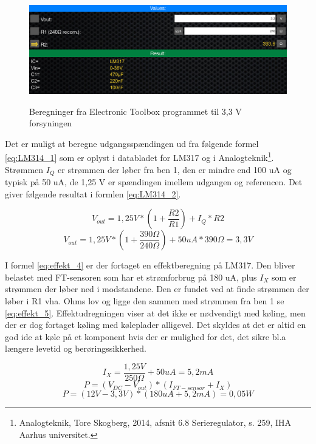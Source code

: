 \begin{figure}[H] \centering
{\includegraphics[width=\textwidth]{filer/design/Billeder/LM317_calc}}
\caption{Beregninger fra Electronic Toolbox programmet til 3,3 V forsyningen}
\label{lab:LM317_calc}
\raggedright
\end{figure}

Det er muligt at beregne udgangsspændingen ud fra følgende formel \ref{eq:LM314_1} som er oplyst i databladet for LM317 og i Analogteknik\footnote{Analogteknik, Tore Skogberg, 2014, afsnit 6.8 Serieregulator, s. 259, IHA Aarhus universitet.}. Strømmen $I_Q$ er strømmen der løber fra ben 1, den er mindre end 100 uA og typisk på 50 uA, de 1,25 V er spændingen imellem udgangen og referencen. Det giver følgende resultat i formlen \ref{eq:LM314_2}. 

\begin{equation} 
V_{out} = 1,25 V*(1+\frac{R2}{R1})+I_Q*R2
\label{eq:LM314_1}
\end{equation}
\begin{equation} 
V_{out} = 1,25 V*(1+\frac{390\Omega}{240\Omega})+50uA*390\Omega = 3,3 V
\label{eq:LM314_2}
\end{equation}


I formel \ref{eq:effekt_4} er der fortaget en effektberegning på LM317. Den bliver belastet med FT-sensoren som har et strømforbrug på 180 uA, plus $I_X$ som er strømmen der løber ned i modstandene. Den er fundet ved at finde strømmen der løber i R1 vha. Ohms lov og ligge den sammen med strømmen fra ben 1 se \ref{eq:effekt_5}. Effektudregningen viser at det ikke er nødvendigt med køling, men der er dog  fortaget køling med køleplader alligevel. Det skyldes at det er altid en god ide at køle på et komponent hvis der er mulighed for det, det sikre bl.a længere levetid og berøringssikkerhed.

\begin{equation} 
I_X = \frac{1,25V}{250\Omega}+50uA = 5,2 mA  
\label{eq:effekt_5}
\end{equation} 
\begin{equation} 
P = (V_{DC}-V_{out})*(I_{FT-sensor}+I_X) 
\label{eq:effekt_3}
\end{equation}
\begin{equation} 
P = (12V - 3,3V)*(180 uA +5,2 mA)= 0,05 W 
\label{eq:effekt_4}
\end{equation}



